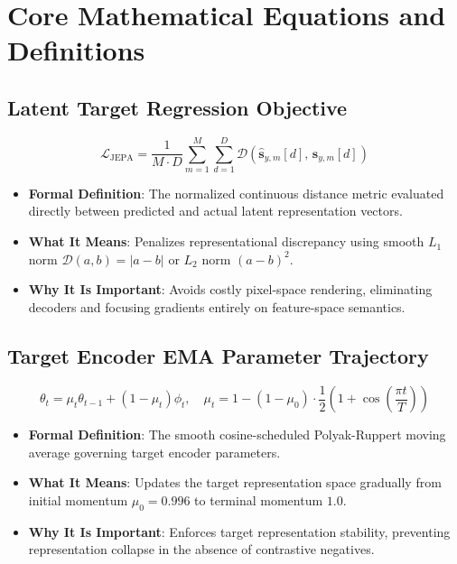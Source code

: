 \documentclass[11pt,a4paper]{article}
\theoremstyle{definition}
\begin{document}
\section{Core Mathematical Equations and Definitions}

\subsection{Latent Target Regression Objective}
{\boldmath
\begin{equation}
\mathcal{L}_{\text{JEPA}} = \frac{1}{M \cdot D} \sum_{m=1}^M \sum_{d=1}^D \mathcal{D}\left( \hat{\mathbf{s}}_{y, m}[d], \, \mathbf{s}_{y, m}[d] \right)
\end{equation}
}
\begin{itemize}
    \item \textbf{Formal Definition}: The normalized continuous distance metric evaluated directly between predicted and actual latent representation vectors.
    \item \textbf{What It Means}: Penalizes representational discrepancy using smooth $L_1$ norm $\mathcal{D}(a, b) = |a - b|$ or $L_2$ norm $(a - b)^2$.
    \item \textbf{Why It Is Important}: Avoids costly pixel-space rendering, eliminating decoders and focusing gradients entirely on feature-space semantics.
\end{itemize}

\subsection{Target Encoder EMA Parameter Trajectory}
{\boldmath
\begin{equation}
\theta_t = \mu_t \theta_{t-1} + (1 - \mu_t) \phi_t, \quad \mu_t = 1 - (1 - \mu_0) \cdot \frac{1}{2}\left( 1 + \cos\left( \frac{\pi t}{T} \right) \right)
\end{equation}
}
\begin{itemize}
    \item \textbf{Formal Definition}: The smooth cosine-scheduled Polyak-Ruppert moving average governing target encoder parameters.
    \item \textbf{What It Means}: Updates the target representation space gradually from initial momentum $\mu_0 = 0.996$ to terminal momentum $1.0$.
    \item \textbf{Why It Is Important}: Enforces target representation stability, preventing representation collapse in the absence of contrastive negatives.
\end{itemize}
\end{document}
